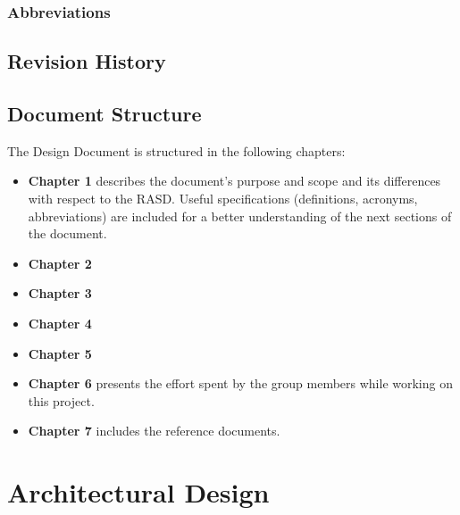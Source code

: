 \documentclass{article}
\begin{document}
\subsubsection{Abbreviations}
\subsection{Revision History}
\subsection{Document Structure}
The Design Document is structured in the following chapters:
\begin{itemize}
\item\textbf{Chapter 1} describes the document’s purpose and scope and its differences with respect to the RASD. Useful specifications (definitions, acronyms, abbreviations) are included for a better understanding of the next sections of the document.
\item\textbf{Chapter 2}
\item\textbf{Chapter 3}
\item\textbf{Chapter 4}
\item\textbf{Chapter 5}
\item\textbf{Chapter 6} presents the effort spent by the group members while working on this project.
\item\textbf{Chapter 7} includes the reference documents.
\end{itemize}

\section{Architectural Design}
\end{document}
